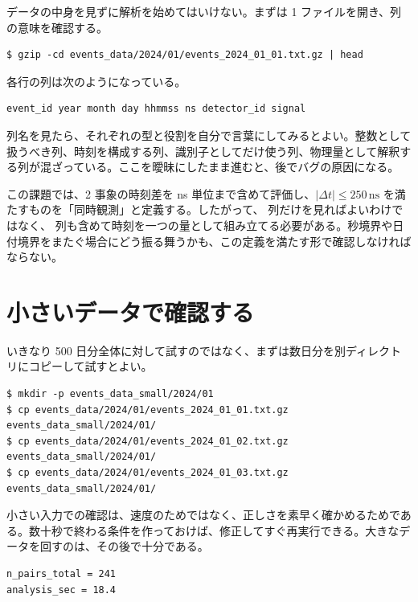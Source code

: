 データの中身を見ずに解析を始めてはいけない。まずは 1 ファイルを開き、列の意味を確認する。

\begin{lstlisting}[numbers=none, xleftmargin=2\zw, caption={中身の確認}]
$ gzip -cd events_data/2024/01/events_2024_01_01.txt.gz | head
\end{lstlisting}

各行の列は次のようになっている。

\begin{lstlisting}[numbers=none, xleftmargin=2\zw]
event_id year month day hhmmss ns detector_id signal
\end{lstlisting}

列名を見たら、それぞれの型と役割を自分で言葉にしてみるとよい。整数として扱うべき列、時刻を構成する列、識別子としてだけ使う列、物理量として解釈する列が混ざっている。ここを曖昧にしたまま進むと、後でバグの原因になる。

この課題では、2 事象の時刻差を ns 単位まで含めて評価し、\(\lvert \Delta t \rvert \le 250\,\mathrm{ns}\) を満たすものを「同時観測」と定義する。したがって、 列だけを見ればよいわけではなく、 列も含めて時刻を一つの量として組み立てる必要がある。秒境界や日付境界をまたぐ場合にどう振る舞うかも、この定義を満たす形で確認しなければならない。

\section{小さいデータで確認する}

いきなり 500 日分全体に対して試すのではなく、まずは数日分を別ディレクトリにコピーして試すとよい。

\begin{lstlisting}[numbers=none, xleftmargin=2\zw, caption={数日分だけを取り出す例}]
$ mkdir -p events_data_small/2024/01
$ cp events_data/2024/01/events_2024_01_01.txt.gz events_data_small/2024/01/
$ cp events_data/2024/01/events_2024_01_02.txt.gz events_data_small/2024/01/
$ cp events_data/2024/01/events_2024_01_03.txt.gz events_data_small/2024/01/
\end{lstlisting}

小さい入力での確認は、速度のためではなく、正しさを素早く確かめるためである。数十秒で終わる条件を作っておけば、修正してすぐ再実行できる。大きなデータを回すのは、その後で十分である。

\begin{lstlisting}[numbers=none, xleftmargin=2\zw, caption={小さいデータでの確認結果の例}]
n_pairs_total = 241
analysis_sec = 18.4
\end{lstlisting}

